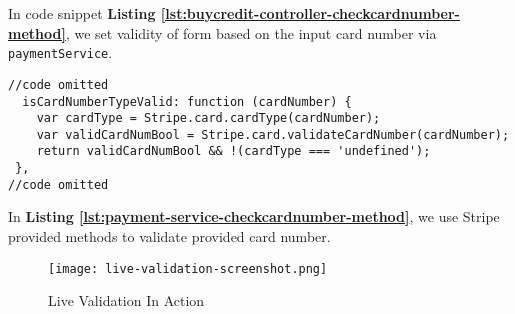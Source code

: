 In code snippet \textbf{Listing \ref{lst:buycredit-controller-checkcardnumber-method}}, we set validity of form based on the input card number via \texttt{paymentService}.\\

\begin{listing}[H]
\begin{verbatim}
//code omitted    
  isCardNumberTypeValid: function (cardNumber) {
    var cardType = Stripe.card.cardType(cardNumber);
    var validCardNumBool = Stripe.card.validateCardNumber(cardNumber);
    return validCardNumBool && !(cardType === 'undefined');
 },
//code omitted   
\end{verbatim}
\label{lst:payment-service-checkcardnumber-method}
\end{listing}

In \textbf{Listing \ref{lst:payment-service-checkcardnumber-method}}, we use Stripe provided methods to validate provided card number.\\

\begin{figure}[!hbt]
  	\centering
 	\texttt{[image: live-validation-screenshot.png]}
  	\caption{Live Validation In Action}
 	\label{fig:live-validation-screenshot}
\end{figure}











